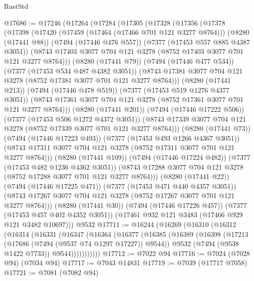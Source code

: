 \begin{lexlean}{RustStd}
\begin{coremodule}
@17686 := @17246
    (@17264
      (@17284
        (@17305
          (@17328
            (@17356
              (@17378
                (@17398
                  (@17420
                    (@17459 (@17464 (@17466 @701 @121 @3277 @8764)))
                    (@8280 (@17441 @88))
                    (@7494 (@17446 @476 @557))
                    (@7377 (@17453 @557 @885 @4387 @3051))
                    (@8743 @17403 @3077 @704 @121 @3278 (@8752 @17403 @3077 @701 @121 @3277 @8764)))
                  (@8280 (@17441 @79))
                  (@7494 (@17446 @477 @534))
                  (@7377 (@17453 @534 @487 @4382 @3051))
                  (@8743 @17381 @3077 @704 @121 @3278 (@8752 @17381 @3077 @701 @121 @3277 @8764)))
                (@8280 (@17441 @213))
                (@7494 (@17446 @478 @519))
                (@7377 (@17453 @519 @1276 @4377 @3051))
                (@8743 @17361 @3077 @704 @121 @3278 (@8752 @17361 @3077 @701 @121 @3277 @8764)))
              (@8280 (@17441 @201))
              (@7494 (@17446 @17222 @506))
              (@7377 (@17453 @506 @1272 @4372 @3051))
              (@8743 @17339 @3077 @704 @121 @3278 (@8752 @17339 @3077 @701 @121 @3277 @8764)))
            (@8280 (@17441 @73))
            (@7494 (@17446 @17223 @493))
            (@7377 (@17453 @493 @1266 @4367 @3051))
            (@8743 @17311 @3077 @704 @121 @3278 (@8752 @17311 @3077 @701 @121 @3277 @8764)))
          (@8280 (@17441 @109))
          (@7494 (@17446 @17224 @482))
          (@7377 (@17453 @482 @1236 @4362 @3051))
          (@8743 @17288 @3077 @704 @121 @3278 (@8752 @17288 @3077 @701 @121 @3277 @8764)))
        (@8280 (@17441 @22))
        (@7494 (@17446 @17225 @471))
        (@7377 (@17453 @471 @440 @4357 @3051))
        (@8743 @17267 @3077 @704 @121 @3278 (@8752 @17267 @3077 @701 @121 @3277 @8764)))
      (@8280 (@17441 @30))
      (@7494 (@17446 @17226 @457))
      (@7377 (@17453 @457 @402 @4352 @3051))
      (@17461 @932 @121 @3483 (@17466 @929 @121 @3482 @10697)))
    @9532
@17711 := @16244
    (@16269
      (@16310
        (@16312
          (@16314
            (@16331
              (@16347
                (@16364
                  (@16377
                    (@16385
                      (@16389
                        (@16398
                          (@17213 (@17686 (@7494 (@9537 @74 @1297 @17227)) @9544))
                          @9532
                          (@7494 (@9538 @1422 @7733))
                          @9544)))))))))))
@17712 := @7022 @94
@17716 := @7024 (@7028 @94) (@7034 @94)
@17717 := @7043 @14831
@17719 := @7039 (@17717 @7058)
@17721 := @7081 (@7082 @94)

\end{coremodule}
\end{lexlean}
